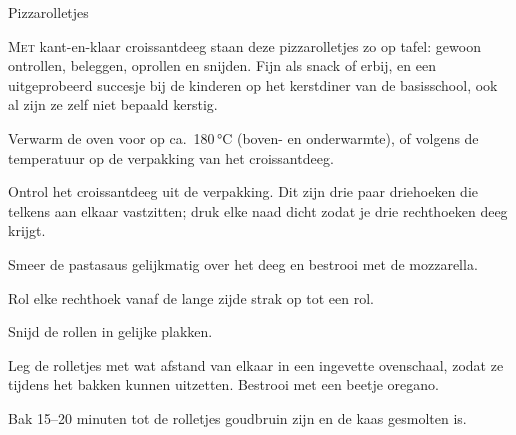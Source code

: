 \begin{recipe}{Pizzarolletjes}


\lettrine{M}{et} kant-en-klaar croissantdeeg staan deze pizzarolletjes zo op
tafel: gewoon ontrollen, beleggen, oprollen en snijden. Fijn als snack of
erbij, en een uitgeprobeerd succesje bij de kinderen op het kerstdiner van
de basisschool, ook al zijn ze zelf niet bepaald kerstig.

\begin{ingredients}
\end{ingredients}

\begin{steps}
  \item Verwarm de oven voor op ca.\ 180\,°C (boven- en onderwarmte), of
        volgens de temperatuur op de verpakking van het croissantdeeg.
  \item Ontrol het croissantdeeg uit de verpakking. Dit zijn drie paar
        driehoeken die telkens aan elkaar vastzitten; druk elke naad dicht
        zodat je drie rechthoeken deeg krijgt.
  \item Smeer de pastasaus gelijkmatig over het deeg en bestrooi met de
        mozzarella.
  \item Rol elke rechthoek vanaf de lange zijde strak op tot een rol.
  \item Snijd de rollen in gelijke plakken.
  \item Leg de rolletjes met wat afstand van elkaar in een ingevette
        ovenschaal, zodat ze tijdens het bakken kunnen uitzetten. Bestrooi
        met een beetje oregano.
  \item Bak 15--20 minuten tot de rolletjes goudbruin zijn en de kaas
        gesmolten is.
\end{steps}
\end{recipe}
